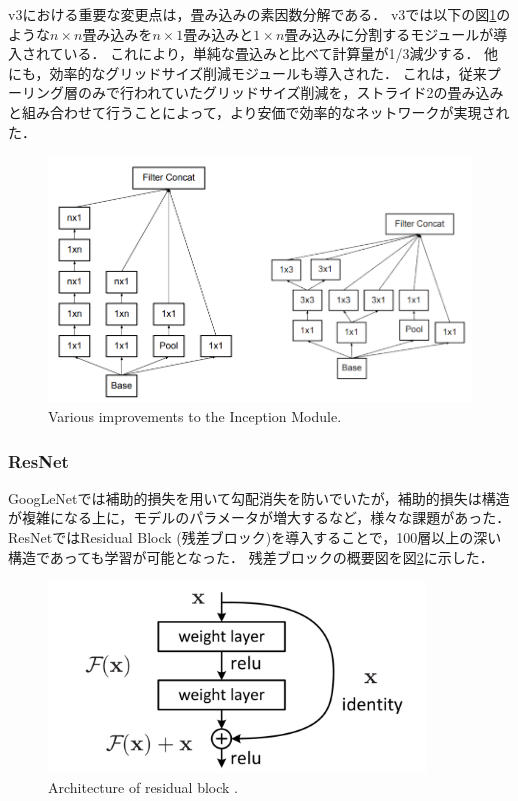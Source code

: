     v3における重要な変更点は，畳み込みの素因数分解である．
    v3では以下の図\ref{improvements_inception}のような$n\times n$畳み込みを$n\times1$畳み込みと$1\times n$畳み込みに分割するモジュールが導入されている．
    これにより，単純な畳込みと比べて計算量が1/3減少する．
    他にも，効率的なグリッドサイズ削減モジュールも導入された．
    これは，従来プーリング層のみで行われていたグリッドサイズ削減を，ストライド2の畳み込みと組み合わせて行うことによって，より安価で効率的なネットワークが実現された．
    \begin{figure}[ht]
      \centering
      \includegraphics[width=12cm]{8_appendix/img/improvements_inception}
      \caption{Various improvements to the Inception Module.}
      \label{improvements_inception}
    \end{figure}

\subsubsection{ResNet}
    GoogLeNetでは補助的損失を用いて勾配消失を防いでいたが，補助的損失は構造が複雑になる上に，モデルのパラメータが増大するなど，様々な課題があった．
    ResNet\cite{he2016deep}ではResidual Block (残差ブロック)を導入することで，100層以上の深い構造であっても学習が可能となった．
    残差ブロックの概要図を図\ref{fig:residual_block}に示した．
    \begin{figure}[ht]
      \centering
      \includegraphics[width=10cm]{8_appendix/img/residual_block.png}
      \caption{Architecture of residual block \cite{he2016deep}.}
      \label{fig:residual_block}
    \end{figure}

